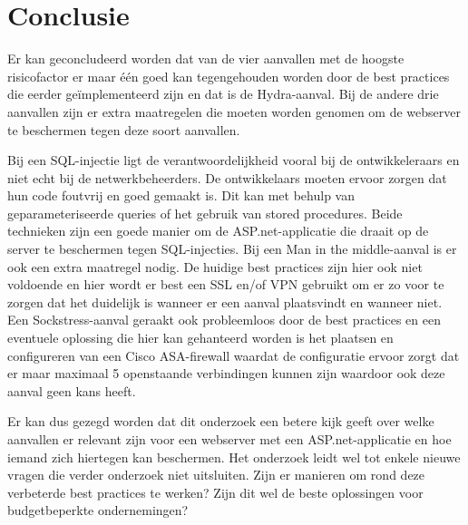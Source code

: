 \documentclass[pdftex,a4paper,12pt]{report}
\begin{document}
\chapter{Conclusie}
\label{ch:conclusie}

Er kan geconcludeerd worden dat van de vier aanvallen met de hoogste risicofactor er maar één goed kan tegengehouden worden door de best practices die eerder geïmplementeerd zijn en dat is de Hydra-aanval. Bij de andere drie aanvallen zijn er extra maatregelen die moeten worden genomen om de webserver te beschermen tegen deze soort aanvallen. \newline

Bij een SQL-injectie ligt de verantwoordelijkheid vooral bij de ontwikkeleraars en niet echt bij de netwerkbeheerders. De ontwikkelaars moeten ervoor zorgen dat hun code foutvrij en goed gemaakt is. Dit kan met behulp van geparameteriseerde queries of het gebruik van stored procedures. Beide technieken zijn een goede manier om de ASP.net-applicatie die draait op de server te beschermen tegen SQL-injecties. Bij een Man in the middle-aanval is er ook een extra maatregel nodig. De huidige best practices zijn hier ook niet voldoende en hier wordt er best een SSL en/of VPN gebruikt om er zo voor te zorgen dat het duidelijk is wanneer er een aanval plaatsvindt en wanneer niet. Een Sockstress-aanval geraakt ook probleemloos door de best practices en een eventuele oplossing die hier kan gehanteerd worden is het plaatsen en configureren van een Cisco ASA-firewall waardat de configuratie ervoor zorgt dat er maar maximaal 5 openstaande verbindingen kunnen zijn waardoor ook deze aanval geen kans heeft. \newline

Er kan dus gezegd worden dat dit onderzoek een betere kijk geeft over welke aanvallen er relevant zijn voor een webserver met een ASP.net-applicatie en hoe iemand zich hiertegen kan beschermen. Het onderzoek leidt wel tot enkele nieuwe vragen die verder onderzoek niet uitsluiten. Zijn er manieren om rond deze verbeterde best practices te werken? Zijn dit wel de beste oplossingen voor budgetbeperkte ondernemingen? 








\listoffigures
\listoftables
\end{document}
